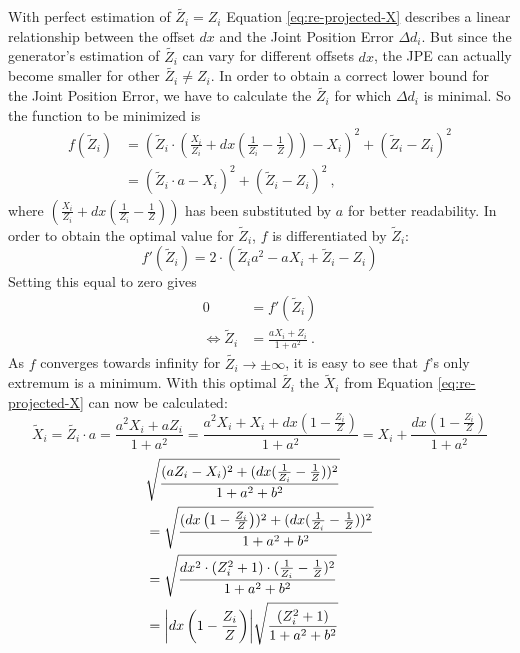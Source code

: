 With perfect estimation of $\widetilde{Z_i} = Z_i$ Equation \eqref{eq:re-projected-X} describes a linear relationship between the offset $dx$ and the Joint Position Error $\Delta d_i$.
But since the generator's estimation of $\widetilde{Z_i}$ can vary for different offsets $dx$, the JPE can actually become smaller for other $\widetilde{Z_i} \neq Z_i$. 
In order to obtain a correct lower bound for the Joint Position Error, we have to calculate the $\widetilde{Z_i}$ for which $\Delta d_i$ is minimal.
So the function to be minimized is
\begin{align}
	\label{eq:minimum-distance}
	f(\widetilde{Z}_i) &= \left ( \widetilde{Z}_i \cdot \left( \frac{X_i}{Z_i} + dx \left( \frac{1}{Z_i} - \frac{1}{Z} \right) \right ) - X_i \right)^2 + ( \widetilde{Z}_i - Z_i ) ^2 \\
	&= \left ( \widetilde{Z}_i \cdot a - X_i \right)^2 + ( \widetilde{Z}_i - Z_i )^2 \ ,
\end{align}
where $\left( \frac{X_i}{Z_i} + dx \left( \frac{1}{Z_i} - \frac{1}{Z} \right) \right )$ has been substituted by $a$ for better readability.
In order to obtain the optimal value for $\widetilde{Z}_i$, $f$ is differentiated by $\widetilde{Z}_i$:
\begin{equation}
	\label{eq:derivative-minimum-distance}
	f'(\widetilde{Z}_i) = 2 \cdot (\widetilde{Z}_i a^2 - a X_i + \widetilde{Z}_i - Z_i)
\end{equation}
Setting this equal to zero gives
\begin{align}
	0 &= f'(\widetilde{Z}_i) \\
	\Leftrightarrow \widetilde{Z}_i & = \frac{a X_i + Z_i}{1 + a^2} \ .
	\label{eq:z_i-min}
\end{align}
As $f$ converges towards infinity for $\widetilde{Z_i} \rightarrow \pm \infty$, it is easy to see that $f$'s only extremum is a minimum.
With this optimal $\widetilde{Z_i}$ the $\widetilde{X}_i$ from Equation \eqref{eq:re-projected-X} can now be calculated:
\begin{equation}
	\label{eq:x_i-min}
	\widetilde{X}_i 
	= \widetilde{Z_i} \cdot a
	=  \frac{a^2 X_i + a Z_i}{1 + a^2} = \frac{a^2 X_i + X_i + dx \left (1 - \frac{Z_i}{Z} \right )}{1 + a^2}
	= X_i + \frac{dx \left (1 - \frac{Z_i}{Z}\right )}{1 + a^2}
\end{equation}
	\begin{align*}
		&\sqrt{\frac{(a Z_i - X_i)^2 + (dx (\frac{1}{Z_i} - \frac{1}{Z}))^2}{1 + a^2 + b^2}}\\
		& = \sqrt{\frac{(dx \left (1 -  \frac{Z_i}{Z} \right ))^2 + (dx (\frac{1}{Z_i} - \frac{1}{Z}))^2}{1 + a^2 + b^2}} \\
		& = \sqrt{\frac{dx^2 \cdot (Z_i^2 + 1) \cdot (\frac{1}{Z_i} - \frac{1}{Z})^2}{1 + a^2 + b^2}}\\
		& = \abs{dx \left (1 -  \frac{Z_i}{Z} \right )} \sqrt{\frac{(Z_i^2 + 1)}{1 + a^2 + b^2}}
	\end{align*}
